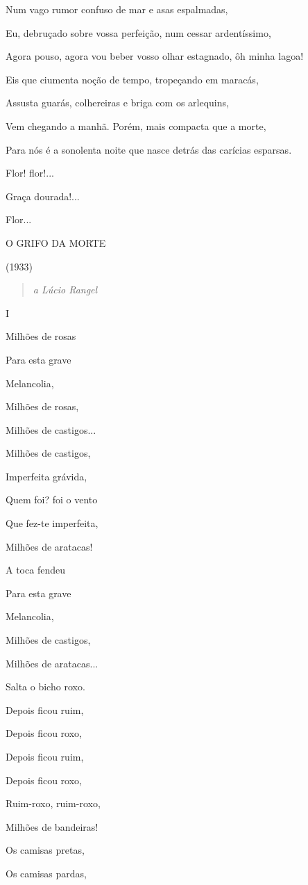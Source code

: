 Num vago rumor confuso de mar e asas espalmadas,

Eu, debruçado sobre vossa perfeição, num cessar ardentíssimo,

Agora pouso, agora vou beber vosso olhar estagnado, ôh minha lagoa!

Eis que ciumenta noção de tempo, tropeçando em maracás,

Assusta guarás, colhereiras e briga com os arlequins,

Vem chegando a manhã. Porém, mais compacta que a morte,

Para nós é a sonolenta noite que nasce detrás das carícias esparsas.

Flor! flor!...

Graça dourada!...

Flor...

\textsc{O GRIFO DA MORTE}

(1933)

\begin{quote}
\emph{a Lúcio Rangel}
\end{quote}

I

Milhões de rosas

Para esta grave

Melancolia,

Milhões de rosas,

Milhões de castigos...

Milhões de castigos,

Imperfeita grávida,

Quem foi? foi o vento

Que fez-te imperfeita,

Milhões de aratacas!

A toca fendeu

Para esta grave

Melancolia,

Milhões de castigos,

Milhões de aratacas...

Salta o bicho roxo.

Depois ficou ruim,

Depois ficou roxo,

Depois ficou ruim,

Depois ficou roxo,

Ruim-roxo, ruim-roxo,

Milhões de bandeiras!

Os camisas pretas,

Os camisas pardas,


